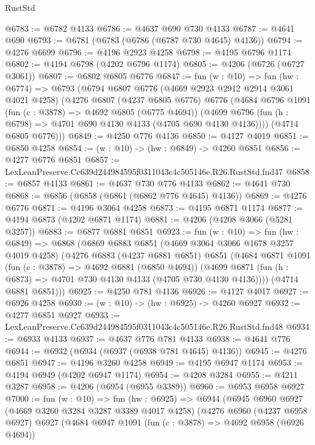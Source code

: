 \begin{lexlean}{RustStd}
\begin{coremodule}
@6783 := @6782 @4133
@6786 := @4637 @690 @730 @4133
@6787 := @4641 @690
@6793 := @6781 (@6783 (@6786 (@6787 @730 @4645) @4136))
@6794 := @4276 @6699
@6796 := @4196 @2923 @4258
@6798 := @4195 @6796 @1174
@6802 := @4194 @6798 (@4202 @6796 @1174)
@6805 := @4206 (@6726 (@6727 @3061))
@6807 := @6802 @6805 @6776
@6847 := fun (w : @10) =>
  fun (hw : @6774) =>
  @6793
    (@6794
      @6807
      @6776
      (@4669 @2923 @2912 @2914 @3061 @4021 @4258)
      (@4276
        @6807
        (@4237 @6805 @6776)
        @6776
        (@4684
          @6796
          @1091
          (fun (c : @3878) => @4692 @6805 (@6775 @4694))
          (@4699 @6796 (fun (h : @6798) => @4701 @690 @4130 @4133 (@4705 @690 @4130 @4136))))
        (@4714 @6805 @6776)))
@6849 := @4250 @776 @4136
@6850 := @4127 @4019
@6851 := @6850 @4258
@6854 := (w : @10) -> (hw : @6849) -> @4260 @6851
@6856 := @4277 @6776 @6851
@6857 := LexLeanPreserve.Cc639d244984595f0311043c4c505146e.R26.RustStd.fnd47
@6858 := @6857 @4133
@6861 := @4637 @730 @776 @4133
@6862 := @4641 @730
@6868 := @6856 (@6858 (@6861 (@6862 @776 @4645) @4136))
@6869 := @4276 @6776
@6871 := @4196 @3064 @4258
@6873 := @4195 @6871 @1174
@6877 := @4194 @6873 (@4202 @6871 @1174)
@6881 := @4206 (@4208 @3066 (@5281 @3257))
@6883 := @6877 @6881 @6851
@6923 := fun (w : @10) =>
  fun (hw : @6849) =>
  @6868
    (@6869
      @6883
      @6851
      (@4669 @3064 @3066 @1678 @3257 @4019 @4258)
      (@4276
        @6883
        (@4237 @6881 @6851)
        @6851
        (@4684
          @6871
          @1091
          (fun (c : @3878) => @4692 @6881 (@6850 @4694))
          (@4699 @6871 (fun (h : @6873) => @4701 @730 @4130 @4133 (@4705 @730 @4130 @4136))))
        (@4714 @6881 @6851)))
@6925 := @4250 @781 @4136
@6926 := @4127 @4017
@6927 := @6926 @4258
@6930 := (w : @10) -> (hw : @6925) -> @4260 @6927
@6932 := @4277 @6851 @6927
@6933 := LexLeanPreserve.Cc639d244984595f0311043c4c505146e.R26.RustStd.fnd48
@6934 := @6933 @4133
@6937 := @4637 @776 @781 @4133
@6938 := @4641 @776
@6944 := @6932 (@6934 (@6937 (@6938 @781 @4645) @4136))
@6945 := @4276 @6851
@6947 := @4196 @3260 @4258
@6949 := @4195 @6947 @1174
@6953 := @4194 @6949 (@4202 @6947 @1174)
@6954 := @4208 @3284
@6955 := @4211 @3287
@6958 := @4206 (@6954 (@6955 @3389))
@6960 := @6953 @6958 @6927
@7000 := fun (w : @10) =>
  fun (hw : @6925) =>
  @6944
    (@6945
      @6960
      @6927
      (@4669 @3260 @3284 @3287 @3389 @4017 @4258)
      (@4276
        @6960
        (@4237 @6958 @6927)
        @6927
        (@4684
          @6947
          @1091
          (fun (c : @3878) => @4692 @6958 (@6926 @4694))

\end{coremodule}
\end{lexlean}

